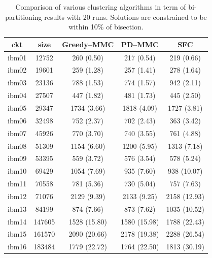 \documentclass[journal]{IEEEtran}
\begin{document}
\begin{table}
\renewcommand{\arraystretch}{1.3}
\caption{Comparison of various clustering algorithms in term of
  bi-partitioning results with 20 runs.
  Solutions are constrained to be within 10\% of bisection.}
\label{clustering_10}
\centering
\begin{tabular}{|c||c|c|c|c|}
\hline
\bfseries ckt & \bfseries size & 
              \bfseries Greedy--MMC & \bfseries PD--MMC & \bfseries SFC  \\
\hline\hline
ibm01 &  12752 &  260 (0.50) &  217 (0.54) &  219 (0.66)  \\
ibm02 &  19601 &  259 (1.28) &  257 (1.41) &  278 (1.64)  \\
ibm03 &  23136 &  788 (1.53) &  774 (1.57) &  942 (2.11)  \\
ibm04 &  27507 &  447 (1.82) &  481 (1.73) &  445 (2.50)  \\
ibm05 &  29347 & 1734 (3.66) & 1818 (4.09) & 1727 (3.81)  \\
ibm06 &  32498 &  752 (2.37) &  702 (2.43) &  363 (3.42)  \\
ibm07 &  45926 &  770 (3.70) &  740 (3.55) &  761 (4.88)  \\
ibm08 &  51309 & 1154 (6.60) & 1200 (5.95) & 1313 (7.18)  \\
ibm09 &  53395 &  559 (3.72) &  576 (3.54) &  578 (5.24)  \\
ibm10 &  69429 & 1054 (7.69) &  935 (7.60) &  938 (10.07)  \\
ibm11 &  70558 &  781 (5.36) &  730 (5.04) &  757 (7.63)  \\
ibm12 &  71076 & 2129 (9.39) & 2133 (9.25) & 2158 (12.93)  \\
ibm13 &  84199 &  874 (7.66) &  873 (7.62) & 1035 (10.52)  \\
ibm14 & 147605 & 1528 (15.80) & 1580 (15.98) & 1788 (22.43)  \\
ibm15 & 161570 & 2090 (20.66) & 2178 (19.38) & 2288 (26.54)  \\
ibm16 & 183484 & 1779 (22.72) & 1764 (22.50) & 1813 (30.19)  \\
\hline
\end{tabular}
\end{table}
\end{document}
